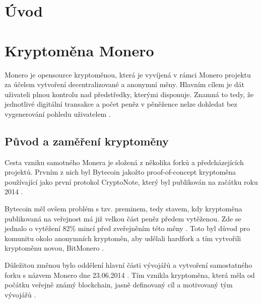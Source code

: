 \documentclass[
  printed, %
  table,   %
  nolof,     %
  nolot,     %
           oneside, color
]{fithesis3}
\begin{document}
\chapter{Úvod}
\chapter{Kryptoměna Monero}
Monero je opensource kryptoměnou, která je vyvíjená v rámci Monero projektu za účelem vytvoření decentralizované a anonymní měny. Hlavním cílem je dát uživateli plnou kontrolu nad předstředky, kterými disponuje. Znamná to tedy, že jednotlivé digitální transakce a počet peněz v pěněžence nelze dohledat bez vygenerování pohledu uživatelem \cite{moneroprojectgithub}.
\section{Původ a zaměření kryptoměny}
Cesta vzniku samotného Monera je složená z několika forků a předcházejících projektů. Prvním z nich byl Bytecoin jakožto proof-of-concept kryptoměna používající jako první protokol CryptoNote, který byl publikován na začátku roku 2014 \cite{githubbytecoin}.

Bytecoin měl ovšem problém s tzv. preminem, tedy stavem, kdy kryptoměna publikovaná na veřejnost má již velkou část peněz předem vytěženou. Zde se jednalo o vytěžení 82\% mincí před zveřejněním této měny \cite{fluffyponyonbytecoin}.
Toto byl důvod pro komunitu okolo anonymních kryptoměn, aby udělali hardfork a tím vytvořili kryptoměnu novou, BitMonero \cite{bitmonero}.

Důležitou změnou bylo oddělení hlavní části vývojářů a vytvoření samostatného forku s názvem Monero dne 23.06.2014 . Tím vznikla kryptoměna, která měla od počátku veřejně známý blockchain, jasně definovaný cíl a motivovaný tým vývojářů \cite{monerofork}.
\end{document}
